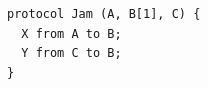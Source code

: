 \begin{lstlisting}[language={},basicstyle=\ttfamily\footnotesize,breaklines=true]
protocol Jam (A, B[1], C) {
  X from A to B;
  Y from C to B;
}
\end{lstlisting}
